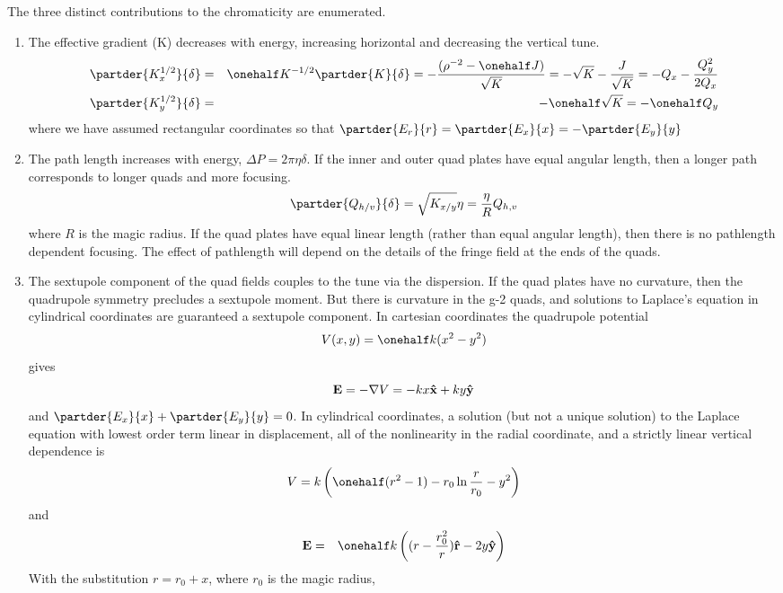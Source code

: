 The three distinct contributions to the chromaticity are enumerated.
\begin{enumerate} 
\item
The effective gradient (K) decreases with
energy, increasing horizontal and decreasing the vertical tune.
\begin{eqnarray*}
\partder{K^{1/2}_x}{\delta} &=& \onehalf K^{-1/2} \partder{K}{\delta} = -\frac{(\rho^{-2} -\onehalf J )}{\sqrt{K}} = -\sqrt{K} - \frac{J}{\sqrt{K}} = -Q_x - \frac{Q_y^2}{2Q_x}\\ 
\partder{K^{1/2}_y}{\delta} &=&  -\onehalf\sqrt{K} = -\onehalf Q_y
\end{eqnarray*} 
where we have assumed rectangular coordinates so that $\partder{E_r}{r}=\partder{E_x}{x}=-\partder{E_y}{y}$
\item The path length increases with energy, $\Delta P = 2\pi\eta \delta$. 
If the inner and outer quad plates
have equal angular length, then a longer path corresponds to longer quads and more focusing.
$$\partder{Q_{h/v}}{\delta} =  \sqrt{K_{x/y}}  \eta = \frac{\eta}{R}Q_{h,v}$$
where $R$ is the magic radius. If the quad plates have equal linear length (rather than equal angular length),
then there is no pathlength dependent focusing. The effect of pathlength will depend on the details of the fringe field at the ends of the quads.
\item The sextupole component of the quad fields couples to the tune via the dispersion.
If the quad plates have no curvature, then the quadrupole symmetry precludes a sextupole moment.
But there is curvature in the g-2 quads, and solutions to Laplace's equation in cylindrical coordinates
are guaranteed a sextupole component.
In cartesian coordinates the quadrupole potential $$V(x,y) = \onehalf k( x^2 - y^2)$$ gives 
$${\bf E} = -{\bf\nabla} V = -kx{\bf\hat x} + ky{\bf\hat y}$$ and $\partder{E_x}{x}+\partder{E_y}{y}=0$.
In cylindrical coordinates, a solution (but not a unique solution) to the Laplace equation with lowest order term linear in displacement, all of the nonlinearity
in the radial coordinate, and a strictly linear vertical dependence is
$$V = k\left(\onehalf(r^2-1) - r_0\ln \frac{r}{r_0} - y^2\right)$$
and 
\begin{eqnarray*}
{\bf E} &=& \onehalf k\left((r-\frac{r_0^2}{r}){\bf \hat r} -2y{\bf \hat y}\right)\\
\end{eqnarray*}
With the substitution $r=r_0+x$, where $r_0$ is the magic radius,
\begin{eqnarray*}

\end{eqnarray*}
\end{enumerate}
